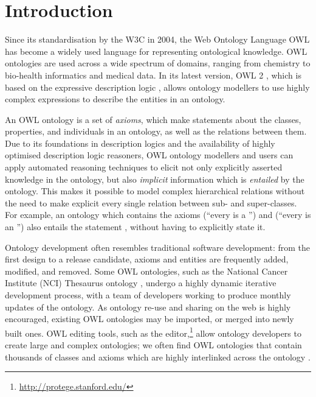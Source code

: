 \chapter{Introduction}
\label{chap:introduction}

Since its standardisation by the W3C in 2004, the Web Ontology Language OWL \cite{w3c09eu} has become a widely used language for representing ontological knowledge. OWL ontologies are used across a wide spectrum of domains, ranging from chemistry to bio-health informatics and medical data. In its latest version, OWL 2 \cite{cuenca-grau08kw}, which is based on the expressive description logic  \cite{dlhb03,horrocks06ya}, allows ontology modellers to use highly complex expressions to describe the entities in an ontology. 

An OWL ontology is a set of \emph{axioms}, which make statements about the classes, properties, and individuals in an ontology, as well as the relations between them. Due to its foundations in description logics \cite{dlhb03} and the availability of highly optimised description logic reasoners, OWL ontology modellers and users can apply automated reasoning techniques to elicit not only explicitly asserted knowledge in the ontology, but also \emph{implicit} information which is \emph{entailed} by the ontology. This makes it possible to model complex hierarchical relations  without the need to make explicit every single relation between sub- and super-classes. For example, an ontology which contains the axioms  (\enquote{every  is a }) and  (\enquote{every  is an }) also entails the statement , without having to explicitly state it.

Ontology development often resembles traditional software development: from the first design to a release candidate, axioms and entities are frequently added, modified, and removed. Some OWL ontologies, such as the National Cancer Institute (NCI) Thesaurus ontology \cite{coronado04zh}, undergo a highly dynamic iterative development process, with a team of developers working to produce monthly updates of the ontology. As ontology re-use and sharing on the web is highly encouraged, existing OWL ontologies may be imported, or merged into newly built ones. OWL editing tools, such as the \protege editor,\footnote{\url{http://protege.stanford.edu/}} allow ontology developers to create large and complex ontologies; we often find OWL ontologies that contain thousands of classes and axioms which are highly interlinked across the ontology \cite{wang06rr,horridge11ac}. 


